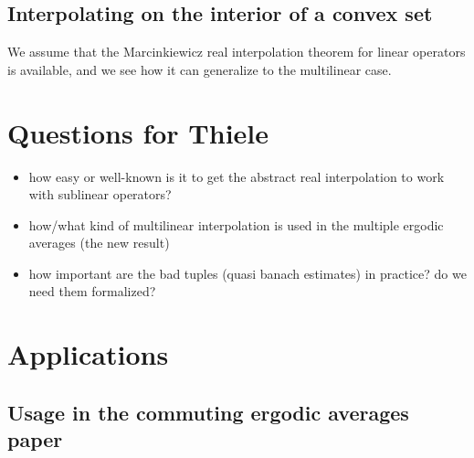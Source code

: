 \documentclass[b5paper]{article}
\begin{document}
\subsection{Interpolating on the interior of a convex set}\label{sec:interp-inter-conv}

We assume that the Marcinkiewicz real interpolation theorem for linear operators is available, and we see how it can generalize to the multilinear case.


\cite{lionsClasseDEspacesDInterpolation1964}


\section{Questions for Thiele}
\begin{itemize}
\item how easy or well-known is it to get the abstract real interpolation to work with sublinear operators?
  
\item how/what kind of multilinear interpolation is used in the multiple ergodic averages (the new result)
\item how important are the bad tuples (quasi banach estimates) in practice? do we need them formalized?
\end{itemize}

\section{Applications}

\subsection{Usage in the commuting ergodic averages paper}


\printbibliography
\end{document}
